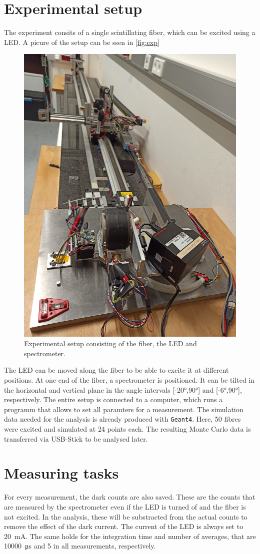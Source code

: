\section{Experimental setup}
\label{sec:Experimental setup}

The experiment consits of a single scintillating fiber, which can be excited using a LED.
A picure of the setup can be ssen in \autoref{fig:exp}

\begin{figure}[H]
	\centering
	\includegraphics[width=0.5\linewidth]{pics/setup.jpg}
	\caption{Experimental setup consisting of the fiber, the LED and spectrometer.}
	\label{fig:exp}
\end{figure}

The LED can be moved along the fiber to be able to excite it at different positions. At one end of the fiber,
a spectrometer is positioned. It can be tilted in the horizontal and vertical plane in the angle intervals [-20°,90°]
and [-6°,90°], respectively.
The entire setup is connected to a computer, which runs a programm that allows to set all paramters for a measurement.
The simulation data needed for the analysis is already produced with \texttt{Geant4}. Here, 50 fibres were excited and simulated at 24 points each.
The resulting Monte Carlo data is transferred via USB-Stick to be analysed later.

\section{Measuring tasks}
\label{sec:Measuring tasks}

For every measurement, the dark counts are also saved. These are the counts that are measured by the spectrometer even
if the LED is turned of and the fiber is not excited. In the analysis, these will be substracted from the actual counts
to remove the effect of the dark current.
The current of the LED is always set to \qty{20}{\milli\ampere}. The same holds for the integration time and number of
averages, that are \qty{10000}{\micro\second} and \qty{5}{} in all measurements, respectively.

